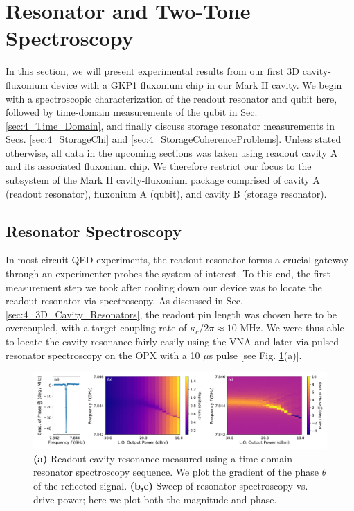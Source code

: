 \clearpage
\section{Resonator and Two-Tone Spectroscopy\label{sec:4_Resonator_and_Two_Tone}}

In this section, we will present experimental results from our first 3D cavity-fluxonium device with a GKP1 fluxonium chip in our Mark II cavity. We begin with a spectroscopic characterization of the readout resonator and qubit here, followed by time-domain measurements of the qubit in Sec. \ref{sec:4_Time_Domain}, and finally discuss storage resonator measurements in Secs. \ref{sec:4_StorageChi} and \ref{sec:4_StorageCoherenceProblems}. Unless stated otherwise, all data in the upcoming sections was taken using readout cavity A and its associated fluxonium chip. We therefore restrict our focus to the subsystem of the Mark II cavity-fluxonium package comprised of cavity A (readout resonator), fluxonium A (qubit), and cavity B (storage resonator).

\subsection{Resonator Spectroscopy}
In most circuit QED experiments, the readout resonator forms a crucial gateway through an experimenter probes the system of interest. To this end, the first measurement step we took after cooling down our device was to locate the readout resonator via spectroscopy. As discussed in Sec. \ref{sec:4_3D_Cavity_Resonators}, the readout pin length was chosen here to be overcoupled, with a target coupling rate of $\kappa_c/2\pi \approx 10$ MHz. We were thus able to locate the cavity resonance fairly easily using the VNA and later via pulsed resonator spectroscopy on the OPX with a 10 $\mu$s pulse [see Fig. \ref{fig:4_resonator_spectroscopy}(a)].
\begin{figure}[h]
    \centering
    \includegraphics[width=\linewidth]{Figures/4/resonator_spectroscopy.pdf}
    \caption[Resonator spectroscopy experiments showing a single resonator spectrum and a sweep vs. drive power.]{\textbf{(a)} Readout cavity resonance measured using a time-domain resonator spectroscopy sequence. We plot the gradient of the phase $\theta$ of the reflected signal. \textbf{(b,c)} Sweep of resonator spectroscopy vs. drive power; here we plot both the magnitude and phase.}
    \label{fig:4_resonator_spectroscopy}
\end{figure}

